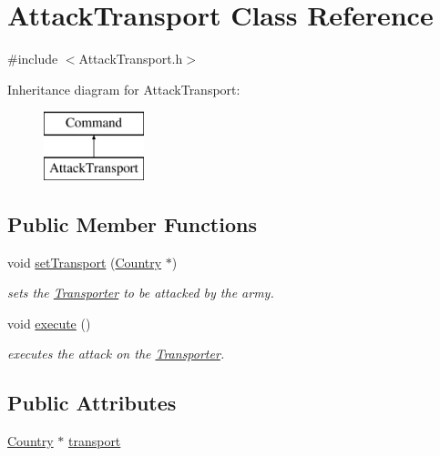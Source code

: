 \hypertarget{class_attack_transport}{}\section{Attack\+Transport Class Reference}
\label{class_attack_transport}


{\ttfamily \#include $<$Attack\+Transport.\+h$>$}

Inheritance diagram for Attack\+Transport\+:\begin{figure}[H]
\begin{center}
\leavevmode
\includegraphics[height=2.000000cm]{class_attack_transport}
\end{center}
\end{figure}
\subsection*{Public Member Functions}
\begin{DoxyCompactItemize}
\item 
void \mbox{\hyperlink{class_attack_transport_ae5170797696e69fa4b9d9c138a77bcd5}{set\+Transport}} (\mbox{\hyperlink{class_country}{Country}} $\ast$)
\begin{DoxyCompactList}\small\item\em sets the \mbox{\hyperlink{class_transporter}{Transporter}} to be attacked by the army. \end{DoxyCompactList}\item 
void \mbox{\hyperlink{class_attack_transport_a9fc5c19e5103ecb3e71dbfb21ad1fef9}{execute}} ()
\begin{DoxyCompactList}\small\item\em executes the attack on the \mbox{\hyperlink{class_transporter}{Transporter}}. \end{DoxyCompactList}\end{DoxyCompactItemize}
\subsection*{Public Attributes}
\begin{DoxyCompactItemize}
\item 
\mbox{\hyperlink{class_country}{Country}} $\ast$ \mbox{\hyperlink{class_attack_transport_a8b480bd76555fcb7c7a54a72db33f742}{transport}}
\end{DoxyCompactItemize}
